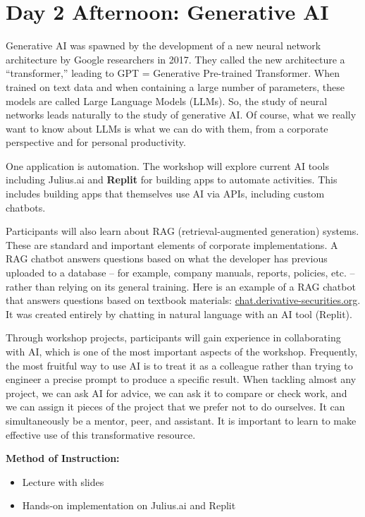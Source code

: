 \documentclass[11pt]{scrartcl}
\begin{document}
\section*{Day 2 Afternoon: Generative AI}

Generative AI was spawned by the development of a new neural network architecture by Google researchers in 2017. They called the new architecture a ``transformer,'' leading to GPT = Generative Pre-trained Transformer. When trained on text data and when containing a large number of parameters, these models are called Large Language Models (LLMs). So, the study of neural networks leads naturally to the study of generative AI. Of course, what we really want to know about LLMs is what we can do with them, from a corporate perspective and for personal productivity.

One application is automation. The workshop will explore current AI tools including Julius.ai and \textbf{Replit} for building apps to automate activities. This includes building apps that themselves use AI via APIs, including custom chatbots.

Participants will also learn about RAG (retrieval-augmented generation) systems. These are standard and important elements of corporate implementations. A RAG chatbot answers questions based on what the developer has previous uploaded to a database -- for example, company manuals, reports, policies, etc. -- rather than relying on its general training. Here is an example of a RAG chatbot that answers questions based on textbook materials: \href{https://chat.derivative-securities.org}{chat.derivative-securities.org}. It was created entirely by chatting in natural language with an AI tool (Replit).


Through workshop projects, participants will gain experience in collaborating with AI, which is one of the most important aspects of the workshop. Frequently, the most fruitful way to use AI is to treat it as a colleague rather than trying to engineer a precise prompt to produce a specific result. When tackling almost any project, we can ask AI for advice, we can ask it to compare or check work, and we can assign it pieces of the project that we prefer not to do ourselves. It can simultaneously be a mentor, peer, and assistant. It is important to learn to make effective use of this transformative resource.

\vspace{\baselineskip}
\noindent\textbf{Method of Instruction:}

\begin{itemize}
\item Lecture with slides
\item Hands-on implementation on Julius.ai and Replit
\end{itemize}
\end{document}

